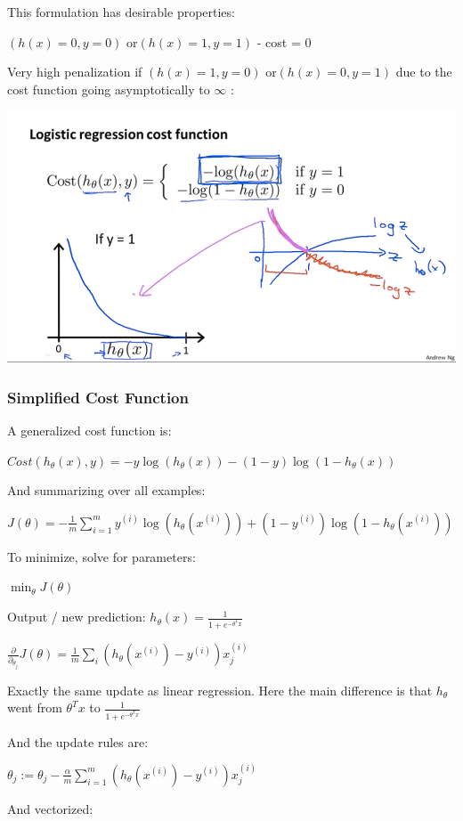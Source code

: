 This formulation has desirable properties: 

$(h(x)=0, y = 0)$ or$(h(x) = 1, y = 1)$  - cost = 0

Very high penalization if $(h(x)=1, y = 0)$ or$(h(x) = 0, y = 1)$ due to the cost function going asymptotically to $\infty$ :

\includegraphics{ml_figures/cost_function.png}

\subsubsection{Simplified Cost Function}

A generalized cost function is: 

$Cost(h_\theta (x), y) =-y\log(h_\theta(x))-(1-y)\log(1-h_\theta(x))  $

And summarizing over all examples:

$J(\theta)= -\frac{1}{m} \sum_{i=1}^{m} y^{(i)}\log(h_\theta(x^{(i)}))+(1-y^{(i)})\log(1-h_\theta(x^{(i)}))$

To minimize, solve for parameters:

$\min_{\theta} J(\theta) $ 

Output / new prediction: $h_\theta(x) = \frac{1}{1+e^{-\theta^T x}}$

$\frac{\partial}{\partial_{\theta_j}} J(\theta) = \frac 1 m \sum_i (h_\theta(x^{(i)})-y^{(i)})x_j^{(i)}$

Exactly the same update as linear regression. Here the main difference is that $h_\theta$  went from $\theta^T x $ to $\frac{1}{1+e^{-\theta^Tx}}$

And the update rules are:

$\theta_j := \theta_j - \frac{\alpha}{m} \sum_{i=1}^m (h_\theta(x^{(i)}) - y^{(i)}) x_j^{(i)}$

And vectorized:

